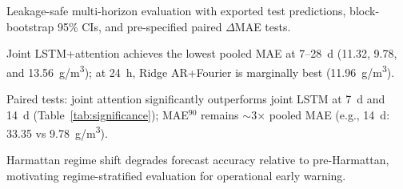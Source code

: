 \documentclass[a4paper,fleqn]{cas-sc}
\begin{document}
\begin{abstract}
\textbf{Third, spike prediction remains an open challenge for all models.} Even for the best-performing joint models, upper-decile error (MAE$^{90}$: mean absolute error on test hours in the top 10\% of observed PM$_{2.5}$) is typically about three times larger than pooled MAE (e.g., at 14~d: 33.35 vs 9.78~\textmu g/m\textsuperscript{3}).

\textbf{Fourth, the Harmattan regime shift substantially increases forecast error.} Regime-stratified evaluation indicates that Harmattan-period error is consistently higher than pre-Harmattan error for multiple baselines, underscoring the need for regime-aware reporting in seasonal West African settings.

Given the limited five-month observational window, these findings are preliminary but actionable. We conclude that (a) leakage-safe evaluation with time-aware uncertainty quantification is essential; (b) joint multi-horizon training can materially improve medium-horizon forecasting when combined with attention; and (c) tail-aware metrics such as MAE$^{90}$ should be standard reporting practice for public-health-oriented forecasting systems.

\end{abstract}




\begin{highlights}
\item Leakage-safe multi-horizon evaluation with exported test predictions, block-bootstrap 95\% CIs, and pre-specified paired $\Delta$MAE tests.
\item Joint LSTM+attention achieves the lowest pooled MAE at 7--28~d (11.32, 9.78, and 13.56~\textmu g/m\textsuperscript{3}); at 24~h, Ridge AR+Fourier is marginally best (11.96~\textmu g/m\textsuperscript{3}).
\item Paired tests: joint attention significantly outperforms joint LSTM at 7~d and 14~d (Table~\ref{tab:significance}); MAE$^{90}$ remains $\sim$3$\times$ pooled MAE (e.g., 14~d: 33.35 vs 9.78~\textmu g/m\textsuperscript{3}).
\item Harmattan regime shift degrades forecast accuracy relative to pre-Harmattan, motivating regime-stratified evaluation for operational early warning.
\end{highlights}
\end{document}
